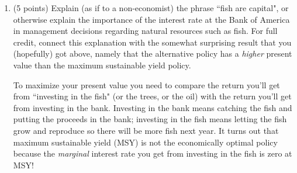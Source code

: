 \documentclass[twoside]{article}
\begin{document}
\begin{enumerate}
\begin{enumerate}
\begin{KEY}
Plug \$84 and 5\% into the perpetuity formula to get a present value of \$1680. Adding this to the \$400 you get from catching 400 fish today and you get a present value of \$2080, which is higher than the present value of the maximum sustainable yield policy.
\end{KEY}

    \item \begin{EXAM} (5 points) Explain (as if to a non-economist) the phrase ``fish are capital", or otherwise explain the importance of the interest rate at the Bank of America in management decisions regarding natural resources such as fish. For full credit, connect this explanation with the somewhat surprising result that you (hopefully) got above, namely that the alternative policy has a \emph{higher} present value than the maximum sustainable yield policy. \clearpage \end{EXAM}

\begin{KEY}
To maximize your present value you need to compare the return you'll get from ``investing in the fish" (or the trees, or the oil) with the return you'll get from investing in the bank. Investing in the bank means catching the fish and putting the proceeds in the bank; investing in the fish means letting the fish grow and reproduce so there will be more fish next year. It turns out that maximum sustainable yield (MSY) is not the economically optimal policy because the \emph{marginal} interest rate you get from investing in the fish is zero at MSY!
\end{KEY}

    \end{enumerate}

\begin{comment}
\item \begin{EXAM}(5 points) Explain (as if to a non-economist) the phrases ``fish are capital," ``trees are capital," and/or ``oil is capital," or otherwise explain the importance of the interest rate at the Bank of America in management decisions regarding natural resources such as fish, trees, and oil.
\clearpage\end{EXAM}

\begin{KEY}
To maximize your present value you need to compare the return you'll get from ``investing in the fish" (or the trees, or the oil) with the return you'll get from investing in the bank. Investing in the bank means catching the fish, cutting down the trees, or selling the oil and putting the proceeds in the bank. Investing in the fish means letting the fish grow and reproduce so there will be more fish next year; investing in the trees means letting the trees grow so there will be more lumber next year; investing in the oil means keeping the oil in the hopes that the price will go up next year.
\end{KEY}
\end{comment}






\end{enumerate}
\end{document}
